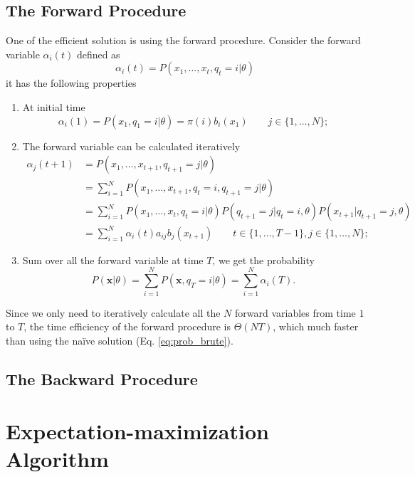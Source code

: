 \documentclass[12pt,final,twoside]{report}
\theoremstyle{plain}
\theoremstyle{definition}
\theoremstyle{remark}
\begin{document}
\subsection{The Forward Procedure}
One of the efficient solution is using the forward procedure. Consider the forward variable $\alpha_i(t)$ defined as
\begin{equation}
  \alpha_i(t) = P(x_1,\dots,x_t,q_t=i|\theta) 
\end{equation}
it has the following properties
\begin{enumerate}
  \item At initial time
    \begin{equation}
      \alpha_i(1) = P(x_1,q_1=i|\theta) = \pi(i) b_i(x_1) \qquad j \in \{1,\dots,N\} ;
    \end{equation}
  \item The forward variable can be calculated iteratively
    \begin{align}
      \alpha_j(t+1) &= P(x_1,\dots,x_{t+1},q_{t+1}=j|\theta) \\
      &= \sum_{i=1}^{N} P(x_1,\dots,x_{t+1},q_t=i,q_{t+1}=j|\theta) \\
      &= \sum_{i=1}^{N} P(x_1,\dots,x_t,q_t=i|\theta) P(q_{t+1}=j|q_t=i,\theta) P(x_{t+1}|q_{t+1}=j,\theta) \\
      &= \sum_{i=1}^{N} \alpha_i(t) a_{ij} b_j(x_{t+1}) \qquad t \in \{1,\dots,T - 1\}, j \in \{1,\dots,N\} ;
    \end{align}
  \item Sum over all the forward variable at time $T$, we get the probability
    \begin{equation}
      P(\mathbf{x}|\theta) = \sum_{i=1}^N P(\mathbf{x},q_T=i|\theta) = \sum_{i=1}^N \alpha_i(T) .
    \end{equation}
\end{enumerate}
Since we only need to iteratively calculate all the $N$ forward variables from time $1$ to $T$, the time efficiency of the forward procedure is $\Theta(NT)$, which much faster than using the na\"ive solution (Eq. \ref{eq:prob_brute}).

\subsection{The Backward Procedure}

\section{Expectation-maximization Algorithm}
\end{document}
